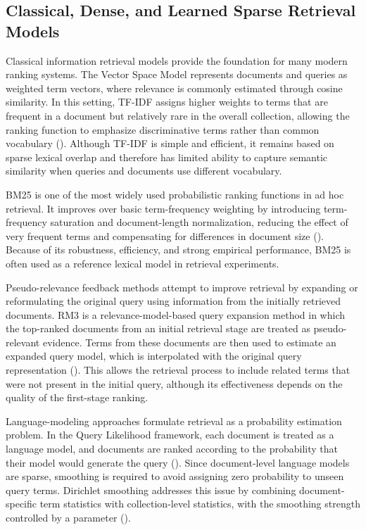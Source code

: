 \documentclass[preprint,5p,times,twocolumn,authoryear]{elsarticle}
\begin{document}
\subsection{Classical, Dense, and Learned Sparse Retrieval Models}

Classical information retrieval models provide the foundation for many modern ranking systems. The Vector Space Model represents documents and queries as weighted term vectors, where relevance is commonly estimated through cosine similarity. In this setting, TF-IDF assigns higher weights to terms that are frequent in a document but relatively rare in the overall collection, allowing the ranking function to emphasize discriminative terms rather than common vocabulary (\cite{salton_vector_1975}). Although TF-IDF is simple and efficient, it remains based on sparse lexical overlap and therefore has limited ability to capture semantic similarity when queries and documents use different vocabulary.

BM25 is one of the most widely used probabilistic ranking functions in ad hoc retrieval. It improves over basic term-frequency weighting by introducing term-frequency saturation and document-length normalization, reducing the effect of very frequent terms and compensating for differences in document size (\cite{bm25,robertson2009probabilistic}). Because of its robustness, efficiency, and strong empirical performance, BM25 is often used as a reference lexical model in retrieval experiments.

Pseudo-relevance feedback methods attempt to improve retrieval by expanding or reformulating the original query using information from the initially retrieved documents. RM3 is a relevance-model-based query expansion method in which the top-ranked documents from an initial retrieval stage are treated as pseudo-relevant evidence. Terms from these documents are then used to estimate an expanded query model, which is interpolated with the original query representation (\cite{lavrenko2001relevance}). This allows the retrieval process to include related terms that were not present in the initial query, although its effectiveness depends on the quality of the first-stage ranking.

Language-modeling approaches formulate retrieval as a probability estimation problem. In the Query Likelihood framework, each document is treated as a language model, and documents are ranked according to the probability that their model would generate the query (\cite{ponte1998language}). Since document-level language models are sparse, smoothing is required to avoid assigning zero probability to unseen query terms. Dirichlet smoothing addresses this issue by combining document-specific term statistics with collection-level statistics, with the smoothing strength controlled by a parameter (\cite{zhai2001smoothing}).
\end{document}

